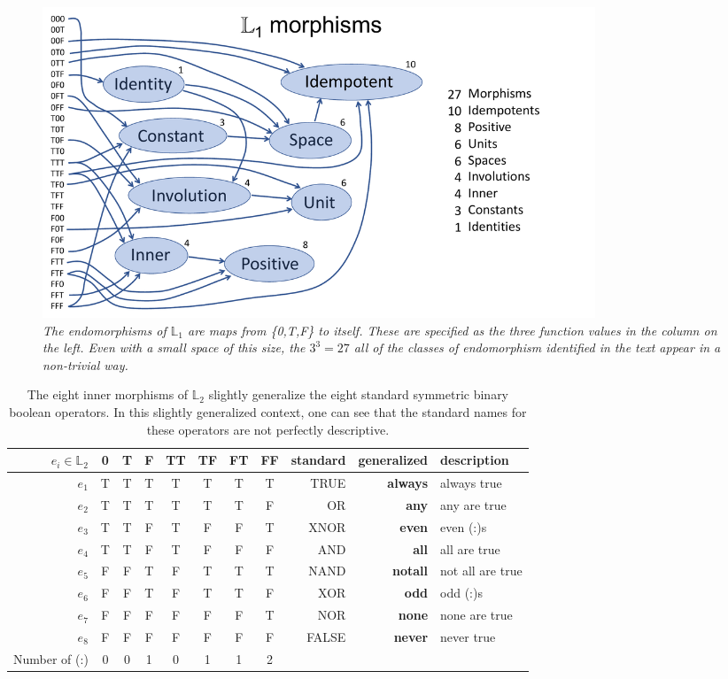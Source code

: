 \documentclass[11pt]{article}
\begin{document}
\begin{figure}[h]
\centering
\includegraphics[width=0.8\textwidth]{L1.pdf}
\caption{{\it The endomorphisms of ${\mathbb L}_1$ are maps from \{0,T,F\} to itself. These are specified as the three function 
values in the column on the left.  Even with a small space of this size, the $3^3=27$ all of the classes of endomorphism identified in the text 
appear in a non-trivial way.}}
\end{figure}
\begin{table}
\centering 
\begin{tabular}{r c c c c c c c r r l}
\hline\hline
$e_i \in {\mathbb L}_2$ & 0 & T & F & TT & TF & FT & FF & standard & generalized & description \\ [0.5ex] 
\hline
$e_1$  & T & T & T & T & T & T & T & TRUE & {\bf always} & always true \\
$e_2$  & T & T & T & T & T & T & F & OR & {\bf any} & any are true \\
$e_3$  & T & T & F & T & F & F & T & XNOR & {\bf even} & even (:)s \\
$e_4$ & T & T & F & T & F & F & F & AND & {\bf all} & all are true \\
$e_5$ & F & F & T & F & T & T & T & NAND & {\bf notall} & not all are true \\
$e_6$ & F & F & T & F & T & T & F & XOR & {\bf odd} & odd (:)s \\
$e_7$ & F & F & F & F & F & F & T & NOR & {\bf none} & none are true  \\
$e_8$ & F & F & F & F & F & F & F & FALSE & {\bf never} & never true \\
\hline
Number of (:)   & 0 & 0 & 1 & 0 & 1 & 1 & 2 &  \\ 
\hline
\end{tabular}
\caption{The eight inner morphisms of ${\mathbb L}_2$ slightly generalize the eight standard symmetric binary boolean operators.
In this slightly generalized context, one can see that the standard names for these operators are not perfectly descriptive.}
\label{table:L2}
\end{table} 
\end{document}
